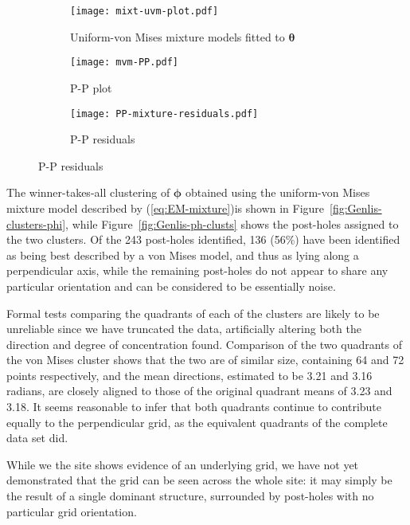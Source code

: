 \documentclass[../../ArchStats.tex]{subfiles}
\begin{document}
\begin{figure}[!ht]
\centering
\caption{$\boldsymbol{\theta}$ with fitted uniform-von Mises mixture and Jones-Pewsey models. The two distributions are very similar, with the mixture model proving a better fit to the data in this case.}
\label{fig:Genlis-clusters}
%
\begin{subfigure}[t]{0.32\textwidth}
\centering
\caption{Uniform-von Mises mixture models fitted to $\boldsymbol{\theta}$}
\label{fig:Genlis-clusters-uvm}
\texttt{[image: mixt-uvm-plot.pdf]}
\end{subfigure}
%
\begin{subfigure}[t]{0.32\textwidth}
\caption{P-P plot}
\vspace{8pt}
\label{fig:Genlis-clusters-PP}
\texttt{[image: mvm-PP.pdf]}
\end{subfigure}
%
\begin{subfigure}[t]{0.32\textwidth}
\caption{P-P residuals}
\vspace{8pt}
\label{fig:Genlis-clusters-PP-res}
\texttt{[image: PP-mixture-residuals.pdf]}
\end{subfigure}
%
\end{figure}

The winner-takes-all clustering of $\boldsymbol{\phi}$ obtained using the uniform-von Mises mixture model described by (\ref{eq:EM-mixture})is shown in Figure~\ref{fig:Genlis-clusters-phi}, while Figure~\ref{fig:Genlis-ph-clusts} shows the post-holes assigned to the two clusters. Of the 243 post-holes identified, 136 (56\%) have been identified as being best described by a von Mises model, and thus as lying along a perpendicular axis, while the remaining post-holes do not appear to share any particular orientation and can be considered to be essentially noise.

Formal tests comparing the quadrants of each of the clusters are likely to be unreliable since we have truncated the data, artificially altering both the direction and degree of concentration found. Comparison of the two quadrants of the von Mises cluster shows that the two are of similar size, containing 64 and 72 points respectively, and the mean directions, estimated to be 3.21 and 3.16 radians, are closely aligned to those of the original quadrant means of 3.23 and 3.18. It seems reasonable to infer that both quadrants continue to contribute  equally to the perpendicular grid,  as the equivalent quadrants of the complete data set did.

While we the site shows evidence of an underlying grid, we have not yet demonstrated that the grid can be seen across the whole site: it may simply be the result of a single dominant structure, surrounded by post-holes with no particular grid orientation.
\end{document}
